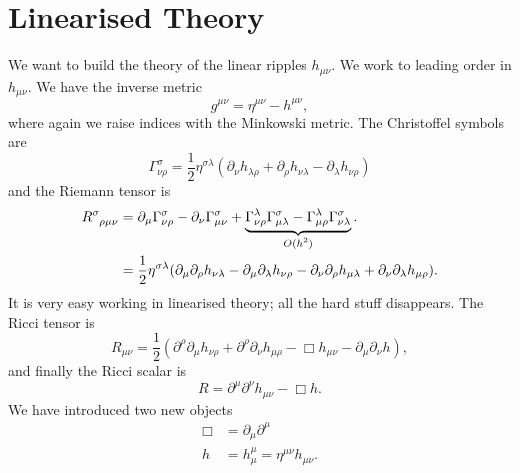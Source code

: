 
\section{Linearised Theory}%
\label{sec:linearised_theory}

We want to build the theory of the linear ripples $h_{\mu\nu}$.
We work to leading order in $h_{\mu\nu}$. We have the inverse metric
\begin{equation}
  g^{\mu\nu} = \eta^{\mu\nu} - h^{\mu\nu},
\end{equation}
where again we raise indices with the Minkowski metric.
The Christoffel symbols are
\begin{equation}
  \Gamma^{\sigma}_{\nu\rho} = \frac{1}{2} \eta^{\sigma\lambda}(\partial_{\nu} h_{\lambda\rho} + \partial_{\rho} h_{\nu\lambda} - \partial_{\lambda} h_{\nu\rho})
\end{equation}
and the Riemann tensor is
\begin{align}
  R\indices{^{\sigma}_{\rho\mu\nu}} &= \partial_{\mu} \Gamma^{\sigma}_{\nu\rho} - \partial_{\nu} \Gamma^{\sigma}_{\mu\nu} + \underbrace{\Gamma^{\lambda}_{\nu\rho} \Gamma^{\sigma}_{\mu\lambda} - \Gamma^{\lambda}_{\mu\rho} \Gamma^{\sigma}_{\nu\lambda}}_{\mathclap{O(h^2)}}. \\
				    &= \frac{1}{2} \eta^{\sigma\lambda} (\partial_{\mu} \partial_{\rho} h_{\nu\lambda} - \partial_{\mu} \partial_{\lambda} h_{\nu\rho} - \partial_{\nu} \partial_{\rho} h_{\mu\lambda} + \partial_{\nu} \partial_{\lambda} h_{\mu\rho}).
\end{align}
It is very easy working in linearised theory; all the hard stuff disappears.
The Ricci tensor is
\begin{equation}
  \label{eq:20-riem}
  R_{\mu\nu} = \frac{1}{2} (\partial^{\rho} \partial_{\mu} h_{\nu\rho} + \partial^{\rho} \partial_{\nu} h_{\mu\rho} - \Box h_{\mu\nu} - \partial_{\mu} \partial_{\nu} h),
\end{equation}
and finally the Ricci scalar is
\begin{equation}
  R = \partial^{\mu} \partial^{\nu} h_{\mu\nu} - \Box h.
\end{equation}
We have introduced two new objects
\begin{align}
  \Box &= \partial_{\mu} \partial^{\mu} \\
  h &= h_{\mu}^{\mu} = \eta^{\mu\nu} h_{\mu\nu}.
\end{align}

